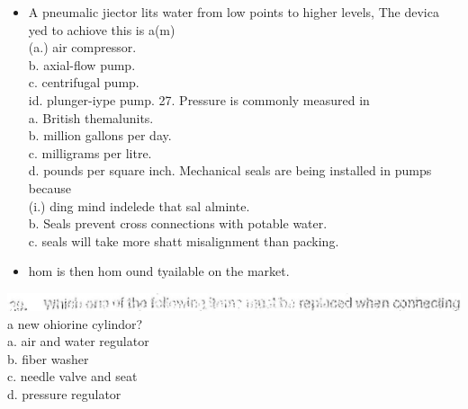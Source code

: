 \documentclass[10pt]{article}
\begin{document}
\begin{itemize}
    \item A pneumalic jiector lits water from low points to higher levels, The devica yed to achiove this is a(m)\\
(a.) air compressor.\\
b. axial-flow pump.\\
c. centrifugal pump.\\
id. plunger-iype pump. 27. Pressure is commonly measured in\\
a. British themalunits.\\
b. million gallons per day.\\
c. milligrams per litre.\\
d. pounds per square inch.
 Mechanical seals are being installed in pumps because\\
(i.) ding mind indelede that sal alminte.\\
b. Seals prevent cross connections with potable water.\\
c. seals will take more shatt misalignment than packing.

  \item hom is then hom ound tyailable on the market.

\end{itemize}

\includegraphics[max width=\textwidth]{2022_11_11_ca6a6c1a0324ee23e523g-21}\\
a new ohiorine cylindor?\\
a. air and water regulator\\
b. fiber washer\\
c. needle valve and seat\\
d. pressure regulator
\end{document}
